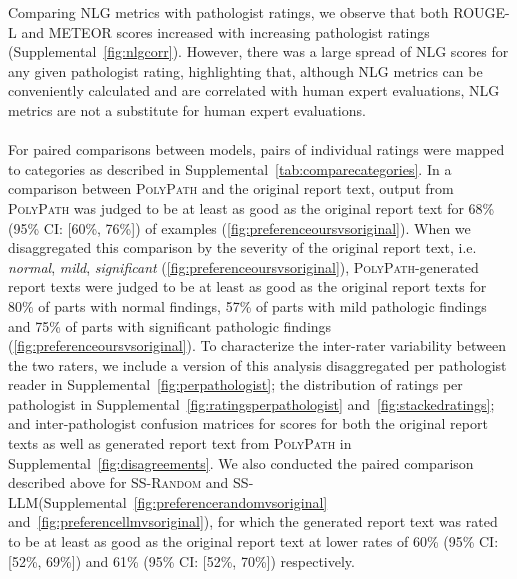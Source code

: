 \documentclass[11pt]{article}
\newcommand{\ourmodel}{\textsc{PolyPath}\xspace}
\newcommand{\randommodel}{\textsc{SS-Random}\xspace}
\newcommand{\llmmodel}{\textsc{SS-LLM}\xspace}
\begin{document}
Comparing NLG metrics with pathologist ratings, we observe that both ROUGE-L and METEOR scores increased with increasing pathologist ratings (Supplemental~\autoref{fig:nlgcorr}). However, there was a large spread of NLG scores for any given pathologist rating, highlighting that, although NLG metrics can be conveniently calculated and are correlated with human expert evaluations, NLG metrics are not a substitute for human expert evaluations. \\ \\
For paired comparisons between models, pairs of individual ratings were mapped to categories as described in Supplemental~\autoref{tab:comparecategories}. In a comparison between \ourmodel and the original report text, output from \ourmodel was judged to be at least as good as the original report text for 68\% (95\% CI: [60\%, 76\%]) of examples (\autoref{fig:preferenceoursvsoriginal}). When we disaggregated this comparison by the severity of the original report text, i.e. \emph{normal}, \emph{mild}, \emph{significant} (\autoref{fig:preferenceoursvsoriginal}), \ourmodel-generated report texts were judged to be at least as good as the original report texts for 80\% of parts with normal findings, 57\% of parts with mild pathologic findings and 75\% of parts with significant pathologic findings (\autoref{fig:preferenceoursvsoriginal}). To characterize the inter-rater variability between the two raters, we include a version of this analysis disaggregated per pathologist reader in Supplemental~\autoref{fig:perpathologist}; the distribution of ratings per pathologist in Supplemental~\autoref{fig:ratingsperpathologist} and~\autoref{fig:stackedratings}; and inter-pathologist confusion matrices for scores for both the original report texts as well as generated report text from \ourmodel in Supplemental~\autoref{fig:disagreements}. We also conducted the paired comparison described above for \randommodel and \llmmodel (Supplemental~\autoref{fig:preferencerandomvsoriginal} and~\autoref{fig:preferencellmvsoriginal}), for which the generated report text was rated to be at least as good as the original report text at lower rates of 60\% (95\% CI: [52\%, 69\%]) and 61\% (95\% CI: [52\%, 70\%]) respectively. 
\end{document}
